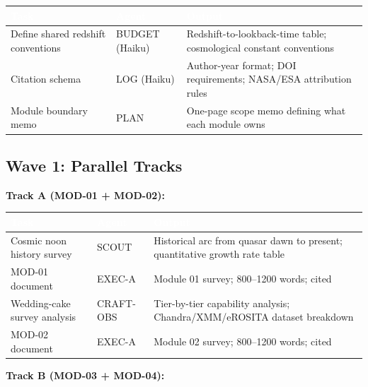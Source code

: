 \documentclass[11pt,letterpaper]{article}
\newcommand{\tableheader}[1]{\textbf{\sffamily\textcolor{white}{#1}}}
\begin{document}
\begin{center}
\begin{tabularx}{\textwidth}{L{3cm}L{3cm}X}
\toprule
{}
\tableheader{Task} & \tableheader{Agent} & \tableheader{Output} \\
\midrule
Define shared redshift conventions & BUDGET (Haiku) & Redshift-to-lookback-time table; cosmological constant conventions \\
Citation schema & LOG (Haiku) & Author-year format; DOI requirements; NASA/ESA attribution rules \\
Module boundary memo & PLAN & One-page scope memo defining what each module owns \\
\bottomrule
\end{tabularx}
\end{center}

\subsection{Wave 1: Parallel Tracks}

\textbf{Track A (MOD-01 + MOD-02):}

\begin{center}
\begin{tabularx}{\textwidth}{L{3cm}L{2cm}X}
\toprule
{}
\tableheader{Task} & \tableheader{Agent} & \tableheader{Output} \\
\midrule
Cosmic noon history survey & SCOUT & Historical arc from quasar dawn to present; quantitative growth rate table \\
MOD-01 document & EXEC-A & Module 01 survey; 800--1200 words; cited \\
Wedding-cake survey analysis & CRAFT-OBS & Tier-by-tier capability analysis; Chandra/XMM/eROSITA dataset breakdown \\
MOD-02 document & EXEC-A & Module 02 survey; 800--1200 words; cited \\
\bottomrule
\end{tabularx}
\end{center}

\textbf{Track B (MOD-03 + MOD-04):}
\end{document}

